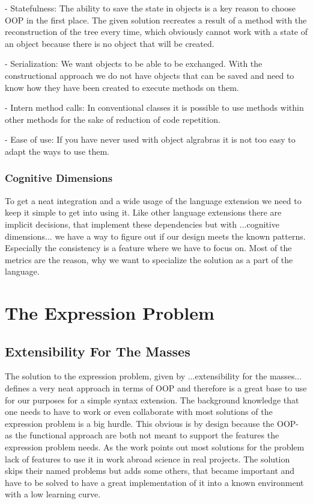 \documentclass{report}
\begin{document}
- Statefulness: The ability to save the state in objects is a key reason to choose OOP in the first place. The given solution recreates a result of a method with the reconstruction of the tree every time, which obviously cannot work with a state of an object because there is no object that will be created.

- Serialization: We want objects to be able to be exchanged. With the constructional approach we do not have objects that can be saved and need to know how they have been created to execute methods on them.

- Intern method calls: In conventional classes it is possible to use methods within other methods for the sake of reduction of code repetition.

- Ease of use: If you have never used with object algrabras it is not too easy to adapt the ways to use them. 

\subsection{Cognitive Dimensions}

To get a neat integration and a wide usage of the language extension we need to keep it simple to get into using it. Like other language extensions there are implicit decisions, that implement these dependencies but with ...cognitive dimensions... we have a way to figure out if our design meets the known patterns. Especially the consistency is a feature where we have to focus on. Most of the metrics are the reason, why we want to specialize the solution as a part of the language.


 
\chapter{The Expression Problem}
\section{Extensibility For The Masses}

The solution to the expression problem, given by ...extensibility for the masses... defines a very neat approach in terms of OOP and therefore is a great base to use for our purposes for a simple syntax extension. The background knowledge that one needs to have to work or even collaborate with most solutions of the expression problem is a big hurdle. This obvious is by design because the OOP- as the functional approach are both not meant to support the features the expression problem needs. As the work points out most solutions for the problem lack of features to use it in work abroad science in real projects. The solution skips their named problems but adds some others, that became important and have to be solved to have a great implementation of it into a known environment with a low learning curve.
\end{document}
